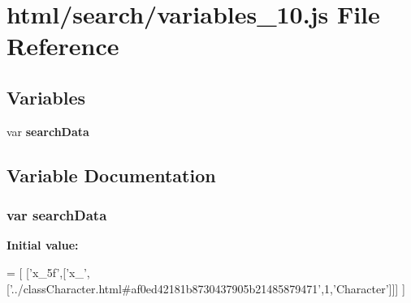 \section{html/search/variables\-\_\-10.js File Reference}
\label{variables__10_8js}
\subsection*{Variables}
\begin{DoxyCompactItemize}
\item 
var {\bf search\-Data}
\end{DoxyCompactItemize}


\subsection{Variable Documentation}
\subsubsection[{search\-Data}]{\setlength{\rightskip}{0pt plus 5cm}var search\-Data}\label{variables__10_8js_ad01a7523f103d6242ef9b0451861231e}
{\bfseries Initial value\-:}
\begin{DoxyCode}
=
[
  [\textcolor{stringliteral}{'x\_5f'},[\textcolor{stringliteral}{'x\_'},[\textcolor{stringliteral}{'../classCharacter.html#af0ed42181b8730437905b21485879471'},1,\textcolor{stringliteral}{'Character'}]]]
]
\end{DoxyCode}
